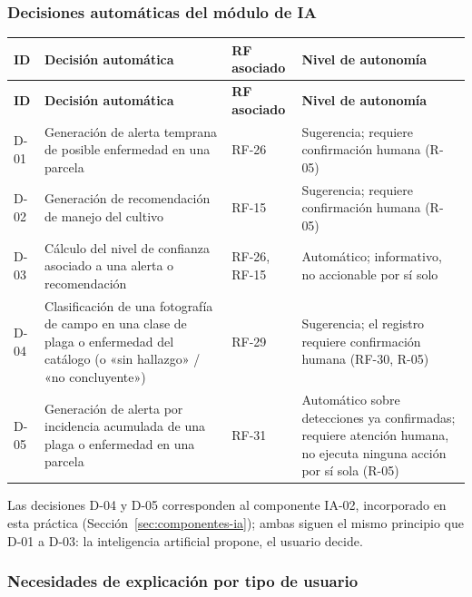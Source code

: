 \documentclass[12pt,a4paper]{article}
\begin{document}
\subsubsection{Decisiones automáticas del módulo de IA}
\label{sec:decisiones-ia}

\begin{center}
\begin{longtable}{|p{1.6cm}|p{5.5cm}|p{2.3cm}|p{4.3cm}|}
\hline
\textbf{ID} & \textbf{Decisión automática} & \textbf{RF asociado} & \textbf{Nivel de autonomía} \\
\hline
\endfirsthead
\hline
\textbf{ID} & \textbf{Decisión automática} & \textbf{RF asociado} & \textbf{Nivel de autonomía} \\
\hline
\endhead
\hline
\endfoot
\hline
\endlastfoot
D-01 & Generación de alerta temprana de posible enfermedad en una parcela & RF-26 & Sugerencia; requiere confirmación humana (R-05) \\
\hline
D-02 & Generación de recomendación de manejo del cultivo & RF-15 & Sugerencia; requiere confirmación humana (R-05) \\
\hline
D-03 & Cálculo del nivel de confianza asociado a una alerta o recomendación & RF-26, RF-15 & Automático; informativo, no accionable por sí solo \\
\hline
D-04 & Clasificación de una fotografía de campo en una clase de plaga o enfermedad del catálogo (o «sin hallazgo» / «no concluyente») & RF-29 & Sugerencia; el registro requiere confirmación humana (RF-30, R-05) \\
\hline
D-05 & Generación de alerta por incidencia acumulada de una plaga o enfermedad en una parcela & RF-31 & Automático sobre detecciones ya confirmadas; requiere atención humana, no ejecuta ninguna acción por sí sola (R-05) \\
\hline
\end{longtable}
\label{tab:decisiones-ia}
\end{center}

Las decisiones D-04 y D-05 corresponden al componente IA-02, incorporado en esta práctica (Sección~\ref{sec:componentes-ia}); ambas siguen el mismo principio que D-01 a D-03: la inteligencia artificial propone, el usuario decide.

\subsubsection{Necesidades de explicación por tipo de usuario}
\label{sec:necesidades-explicacion}
\end{document}
